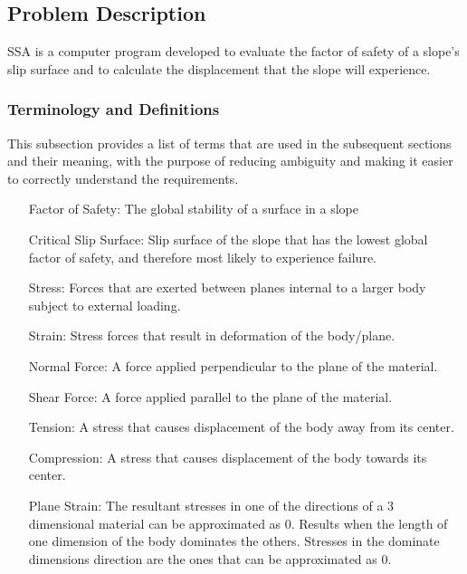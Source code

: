 \documentclass[12pt]{article}
\begin{document}
\subsection{Problem Description}
\label{Sec:ProbDesc}
SSA is a computer program developed to evaluate the factor of safety of a slope's slip surface and to calculate the displacement that the slope will experience.
\subsubsection{Terminology and Definitions}
\label{Sec:TermandDefi}
This subsection provides a list of terms that are used in the subsequent sections and their meaning, with the purpose of reducing ambiguity and making it easier to correctly understand the requirements.
\begin{itemize}
\item[Factor of Safety:]The global stability of a surface in a slope
\item[Critical Slip Surface:]Slip surface of the slope that has the lowest global factor of safety, and therefore most likely to experience failure.
\item[Stress:]Forces that are exerted between planes internal to a larger body subject to external loading.
\item[Strain:]Stress forces that result in deformation of the body/plane.
\item[Normal Force:]A force applied perpendicular to the plane of the material.
\item[Shear Force:]A force applied parallel to the plane of the material.
\item[Tension:]A stress that causes displacement of the body away from its center.
\item[Compression:]A stress that causes displacement of the body towards its center.
\item[Plane Strain:]The resultant stresses in one of the directions of a 3 dimensional material can be approximated as 0. Results when the length of one dimension of the body dominates the others. Stresses in the dominate dimensions direction are the ones that can be approximated as 0.
\end{itemize}
\end{document}
